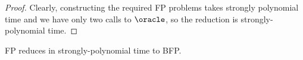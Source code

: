 \begin{proof}
Clearly, constructing the required FP problems takes strongly polynomial time and we have only two calls to $\oracle$, so the reduction is strongly-polynomial time.
\end{proof}

\begin{lemma}
FP reduces in strongly-polynomial time to BFP.
\end{lemma}




